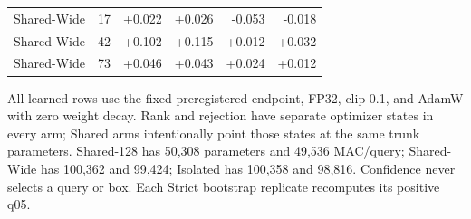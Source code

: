 \begin{table}[t]
\begin{tabular}{lrrrrr}
Shared-Wide & 17 & +0.022 & +0.026 & -0.053 & -0.018 \\
Shared-Wide & 42 & +0.102 & +0.115 & +0.012 & +0.032 \\
Shared-Wide & 73 & +0.046 & +0.043 & +0.024 & +0.012 \\
\bottomrule
\end{tabular}
\parbox{0.98\textwidth}{\scriptsize All learned rows use the fixed
preregistered endpoint, FP32, clip 0.1, and AdamW with zero weight decay. Rank and rejection
have separate optimizer states in every arm; Shared arms intentionally point
those states at the same trunk parameters. Shared-128 has 50,308 parameters
and 49,536 MAC/query; Shared-Wide has 100,362 and 99,424; Isolated has 100,358
and 98,816. Confidence never selects a query or box. Each Strict bootstrap
replicate recomputes its positive q05.}
\end{table}
